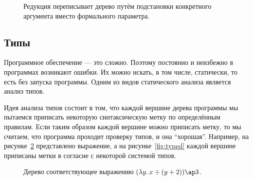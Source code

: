 \begin{figure}
    \centering
    \caption{Редукция переписывает дерево путём подстановки конкретного аргумента вместо формального параметра.}
    \label{fig:reduction}
\end{figure}

\subsection{Типы}

Программное обеспечение --- это сложно.
Поэтому постоянно и неизбежно в программах возникают ошибки.
Их можно искать, в том числе, статически, то есть без запуска программы.
Одним из видов статического анализа является анализ типов.

Идея анализа типов состоит в том, что каждой вершине дерева программы мы пытаемся приписать некоторую синтаксическую метку по определённым правилам.
Если таким образом каждой вершине можно приписать метку, то мы считаем, что программа проходит проверку типов, и она ``хорошая''.
Например, на рисунке\ \ref{fig:to-be-typed} представлено выражение, а на рисунке\ \ref{fig:typed} каждой вершине приписаны метки в согласие с некоторой системой типов.

\begin{figure}
    \centering
    \caption{Дерево соответствующее выражению $(\lambda y\ldotp x \div (y + 2)) \ap 3$.}
    \label{fig:to-be-typed}
\end{figure}

